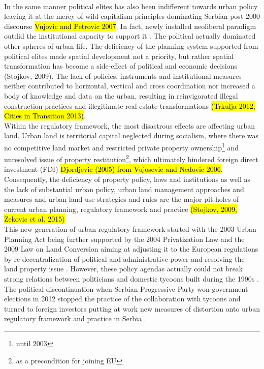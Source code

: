 \documentclass[11pt]{report}
\begin{document}
\\      
In the same manner political elites has also been indifferent towards urban policy leaving it at the mercy of wild capitalism principles dominating Serbian post-2000 discourse \hl{Vujovic and Petrovic 2007}.
In fact, newly installed neoliberal paradigm outdid the institutional capacity to support it \cite{Peric 2016}.
The political actually dominated other spheres of urban life. The deficiency of the planning system supported from political elites made spatial development not a priority, but rather spatial transformation has become a side-effect of political and economic decisions (Stojkov, 2009). 
The lack of policies, instruments and institutional measures neither contributed to horizontal, vertical and cross coordination nor increased a body of knowledge and data on the urban, resulting in reinvigorated illegal construction practices and illegitimate real estate transformations \hl{(Trkulja 2012, Cities in Transition 2013)}.
\\
Within the regulatory framework, the most disastrous effects are affecting urban land. Urban land is territorial capital neglected during socialism, where there was no competitive land market and restricted private property ownership\footnote{until 2003} and unresolved issue of property restitution\footnote{as a precondition for joining EU}, which ultimately hindered foreign direct investment (FDI) \hl{Djordjevic (2005) from Vujosevic and Nedovic 2006}.  
Consequently, the deficiency of property policy, laws and institutions as well as the lack of substantial urban policy, urban land management approaches and measures and urban land use strategies and rules are the major pit-holes of current urban planning, regulatory framework and practice \hl{(Stojkov, 2009, Zekovic et al. 2015)} 
\\
This new generation of urban regulatory framework started with the 2003 Urban Planning Act being further supported by the 2004 Privatization Law and the 2009 Law on Land Conversion aiming at adjusting it to the European regulations by re-decentralization of political and administrative power and resolving the land property issue \cite{Cagic 2014}. However, these policy agendas actually could not break strong relations between politicians and domestic tycoons built during the 1990s \cite{Peric 2016}.
The political discontinuation when Serbian Progressive Party won government elections in 2012 stopped the practice of the collaboration with tycoons and turned to foreign investors putting at work new measures of distortion onto urban regulatory framework and practice in Serbia \cite{Peric 2016}.
            
\end{document}
